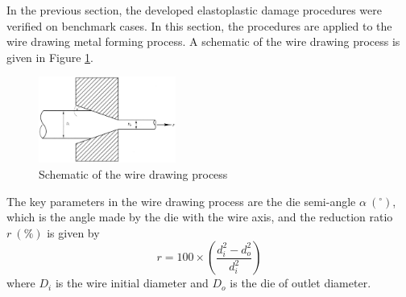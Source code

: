 \documentclass[sn-mathphys,Numbered,draft]{sn-jnl}%
\begin{document}
In the previous section, the developed elastoplastic damage procedures were verified on benchmark cases.
In this section, the procedures are applied to the wire drawing metal forming process.
A schematic of the wire drawing process is given in Figure \ref{fig:wireDrawing}.
\begin{figure}[htb]
\begin{center}
	\includegraphics[width=0.4\textwidth]{./Figures/SimulationAndAnalysis/modelCompare/drawingSchematic.png}
	\caption{Schematic of the wire drawing process}
	\label{fig:wireDrawing}
\end{center}
\end{figure}
The key parameters in the wire drawing process are the die semi-angle $\alpha\ (^{\circ})$, which is the angle made by the die with the wire axis, and the reduction ratio $r\ (\%)$ is given by
\begin{equation}
    r = 100 \times \left(\frac{d_i^2 - d_o^2}{d_i^2}\right)
\end{equation}
where $D_i$ is the wire initial diameter and $D_o$ is the die of outlet diameter.

\end{document}
